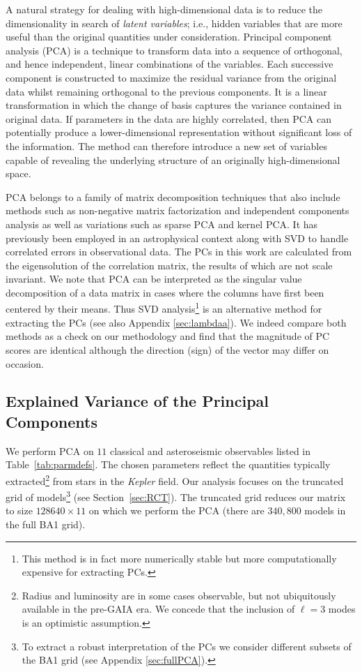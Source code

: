 A natural strategy for dealing with high-dimensional data is to reduce the dimensionality in search of \emph{latent variables}; i.e., hidden variables that are more useful than the original quantities under consideration. 
Principal component analysis (PCA) is a technique to transform data into a sequence of orthogonal, and hence independent,  linear combinations of the variables.
Each successive component is constructed to maximize the residual variance from the original data whilst remaining orthogonal to the previous components.
It is a linear transformation in which the change of basis captures the variance contained in original data. 
If parameters in the data are highly correlated, then PCA can potentially produce a lower-dimensional representation without significant loss of the information. 
The method can therefore introduce a new set of variables capable of revealing the underlying structure of an originally high-dimensional space.

 

PCA  belongs to a family of matrix decomposition techniques that also include methods such as non-negative matrix factorization and independent components analysis as well as variations such as sparse PCA and kernel PCA. 
It has previously been employed in an astrophysical context \citep{2008ApJ...686.1349B, 1987ASSL..131.....M} along with SVD \citep{1994ApJ...427.1013B, 2009ApJ...699..373M} to handle correlated errors in observational data. 
The PCs in this work are calculated from the eigensolution of the correlation matrix, the results of which are not scale invariant. 
We note that PCA can be interpreted as the singular value decomposition of a data matrix in cases where the columns have first been centered by their means. 
Thus SVD analysis\footnote{This method is in fact more numerically stable but more computationally expensive for extracting PCs.} is an alternative method for extracting the PCs (see also Appendix \ref{sec:lambdaa}). 
We indeed compare both methods as a check on our methodology and find that the magnitude of PC scores are identical although the direction (sign) of the vector may differ on occasion.





\subsection{Explained Variance of the Principal Components}
\label{sec:ev}
We perform PCA on $11$ classical and asteroseismic observables listed in Table~\ref{tab:parmdefs}.
The chosen parameters reflect the quantities typically  extracted\footnote{Radius and luminosity are in some cases observable, but not ubiquitously available in the pre-GAIA era. We concede that the inclusion of ${\ell=3}$ modes is an optimistic assumption.} from stars in the \emph{Kepler} \citep{2004SPIE.5487.1491K,2010Sci...327..977B} field.
Our analysis focuses on the  truncated grid of models\footnote{To extract a robust interpretation of the PCs we consider different subsets of the BA1 grid (see Appendix \ref{sec:fullPCA}).} (see Section~\ref{sec:RCT}).
The truncated grid reduces our matrix to size ${128640 \times 11}$ on which we perform the PCA (there are $340,800$ models in the full BA1 grid). 


